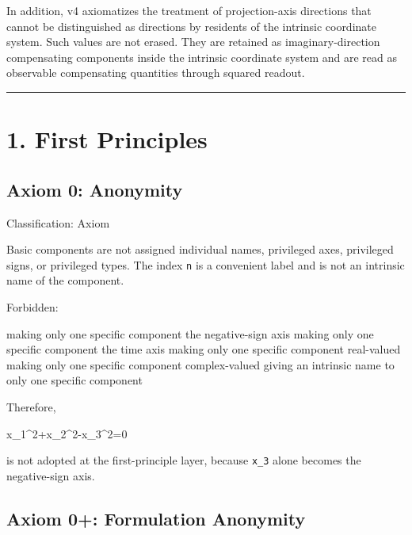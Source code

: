 \documentclass[
  a4paper,
]{article}
\newenvironment{Shaded}{}{}
\newcommand{\NormalTok}[1]{#1}
\begin{document}
In addition, v4 axiomatizes the treatment of projection-axis directions
that cannot be distinguished as directions by residents of the intrinsic
coordinate system. Such values are not erased. They are retained as
imaginary-direction compensating components inside the intrinsic
coordinate system and are read as observable compensating quantities
through squared readout.

\begin{center}\rule{0.5\linewidth}{0.5pt}\end{center}

\section{1. First Principles}\label{first-principles}

\subsection{Axiom 0: Anonymity}\label{axiom-0-anonymity}

Classification: Axiom

Basic components are not assigned individual names, privileged axes,
privileged signs, or privileged types. The index \texttt{n} is a
convenient label and is not an intrinsic name of the component.

Forbidden:

\begin{Shaded}
\begin{Highlighting}[]
\NormalTok{making only one specific component the negative{-}sign axis}
\NormalTok{making only one specific component the time axis}
\NormalTok{making only one specific component real{-}valued}
\NormalTok{making only one specific component complex{-}valued}
\NormalTok{giving an intrinsic name to only one specific component}
\end{Highlighting}
\end{Shaded}

Therefore,

\begin{Shaded}
\begin{Highlighting}[]
\NormalTok{x\_1\^{}2+x\_2\^{}2{-}x\_3\^{}2=0}
\end{Highlighting}
\end{Shaded}

is not adopted at the first-principle layer, because \texttt{x\_3} alone
becomes the negative-sign axis.

\subsection{Axiom 0+: Formulation
Anonymity}\label{axiom-0-formulation-anonymity}
\end{document}
